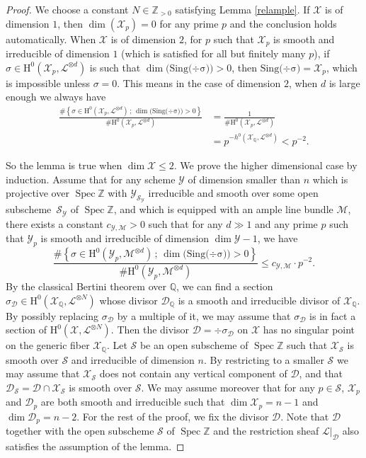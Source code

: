 \documentclass[JEP,XML,SOM,Unicode,published]{cedram}
\newcommand{\sep}{\,;\,}
\theoremstyle{plain}
\theoremstyle{definition}
\newcommand{\ho}{\mathrm{H}}
\newcommand{\X}{\mathcal{X}}
\newcommand{\li}{\mathcal{L}}
\newcommand{\Q}{\mathbb{Q}}
\newcommand{\Z}{\mathbb{Z}}
\DeclareMathOperator{\Spec}{Spec}
\begin{document}
\begin{proof}
We choose a constant $N\in \Z_{>0}$ satisfying Lemma \ref{relample}. If $\X$ is of dimension $1$, then $\dim(\X_p)=0$ for any prime $p$ and the conclusion holds automatically. When $\X$ is of dimension $2$, for $p$ such that $\X_p$ is smooth and irreducible of dimension $1$ (which is satisfied for all but finitely many $p$), if $\sigma\in \ho^0(\X_p, \li^{\otimes d})$ is such that $\dim\big(\mathrm{Sing(\div \sigma})\big)>0$, then $\mathrm{Sing(\div \sigma})=\X_p$, which is impossible unless $\sigma=0$. This means in the case of dimension $2$, when $d$ is large enough we always have
\begin{align*}
\frac{\#\left\{ \sigma\in \ho^0(\X_p, \li^{\otimes d})\sep \dim\big(\mathrm{Sing(\div \sigma})\big)>0 \right\}}{\#\ho^0(\X_p, \li^{\otimes d})}&=\frac{1}{\#\ho^0(\X_p, \li^{\otimes d})}\\
&=p^{-h^0(\X_{\Q},\li^{\otimes d})}<p^{-2}.
\end{align*}

So the lemma is true when $\dim \X\leq 2$. We prove the higher dimensional case by induction. Assume that for any scheme $\mathcal{Y}$ of dimension smaller than $n$ which is projective over $\Spec \Z$ with $\mathcal{Y}_{\mathcal{S}_{\mathcal{Y}}}$ irreducible and smooth over some open subscheme~$\mathcal{S}_{\mathcal{Y}}$ of $\Spec \Z$, and which is equipped with an ample line bundle $\mathcal{M}$, there exists a constant $c_{\mathcal{Y},\mathcal{M}}>0$ such that for any $d\gg 1$ and any prime $p$ such that $\mathcal{Y}_p$ is smooth and irreducible of dimension $\dim\mathcal{Y}-1$, we have
\[
\frac{\#\left\{ \sigma\in \ho^0(\mathcal{Y}_p, \mathcal{M}^{\otimes d})\sep \dim\big(\mathrm{Sing(\div \sigma})\big)>0 \right\}}{\#\ho^0(\mathcal{Y}_p, \mathcal{M}^{\otimes d})}\leq c_{\mathcal{Y},\mathcal{M}}\cdot p^{-2}.
\]
By the classical Bertini theorem over $\Q$, we can find a section $\sigma_{\mathcal{D}}\in \ho^0(\X_{\Q}, \li^{\otimes N})$ whose divisor $\mathcal D_{\Q}$ is a smooth and irreducible divisor of $\X_{\Q}$. By possibly replacing $\sigma_{\mathcal D}$ by a multiple of it, we may assume that $\sigma_{\mathcal D}$ is in fact a section of $ \ho^0(\X, \li^{\otimes N})$. Then the divisor $\mathcal{D}=\div \sigma_{\mathcal{D}}$ on $\X$ has no singular point on the generic fiber $\X_{\Q}$. Let $\mathcal{S}$ be an open subscheme of $\Spec \Z$ such that $\X_{\mathcal{S}}$ is smooth over $\mathcal{S}$ and irreducible of dimension $n$. By restricting to a smaller $\mathcal{S}$ we may assume that $\X_{\mathcal{S}}$ does not contain any vertical component of $\mathcal{D}$, and that $\mathcal{D}_{\mathcal{S}}=\mathcal{D}\cap \X_{\mathcal{S}}$ is smooth over $\mathcal{S}$. We may assume moreover that for any $p\in \mathcal{S}$, $\X_p$ and $\mathcal{D}_p$ are both smooth and irreducible such that $\dim\X_p=n-1$ and $\dim\mathcal{D}_p=n-2$. For the rest of the proof, we fix the divisor $\mathcal{D}$. Note that $\mathcal{D}$ together with the open subscheme $\mathcal{S}$ of $\Spec \Z$ and the restriction sheaf $\li|_{\mathcal{D}}$ also satisfies the assumption of the lemma.


\end{proof}
\end{document}
